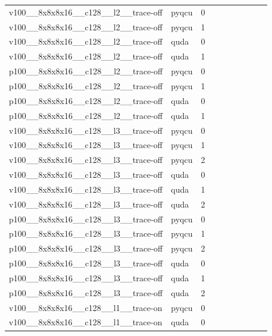 \begin{table}[htbp]
\begin{tabular}{@{}llrrrrrrrr@{}}
v100\_\_8x8x8x16\_\_c128\_\_l2\_\_trace-off & pyqcu & 0 &  &  &  &  &  &  &  \\
v100\_\_8x8x8x16\_\_c128\_\_l2\_\_trace-off & pyqcu & 1 &  &  &  &  &  &  &  \\
v100\_\_8x8x8x16\_\_c128\_\_l2\_\_trace-off & quda & 0 &  &  &  &  &  &  &  \\
v100\_\_8x8x8x16\_\_c128\_\_l2\_\_trace-off & quda & 1 &  &  &  &  &  &  &  \\
p100\_\_8x8x8x16\_\_c128\_\_l2\_\_trace-off & pyqcu & 0 &  &  &  &  &  &  &  \\
p100\_\_8x8x8x16\_\_c128\_\_l2\_\_trace-off & pyqcu & 1 &  &  &  &  &  &  &  \\
p100\_\_8x8x8x16\_\_c128\_\_l2\_\_trace-off & quda & 0 &  &  &  &  &  &  &  \\
p100\_\_8x8x8x16\_\_c128\_\_l2\_\_trace-off & quda & 1 &  &  &  &  &  &  &  \\
v100\_\_8x8x8x16\_\_c128\_\_l3\_\_trace-off & pyqcu & 0 &  &  &  &  &  &  &  \\
v100\_\_8x8x8x16\_\_c128\_\_l3\_\_trace-off & pyqcu & 1 &  &  &  &  &  &  &  \\
v100\_\_8x8x8x16\_\_c128\_\_l3\_\_trace-off & pyqcu & 2 &  &  &  &  &  &  &  \\
v100\_\_8x8x8x16\_\_c128\_\_l3\_\_trace-off & quda & 0 &  &  &  &  &  &  &  \\
v100\_\_8x8x8x16\_\_c128\_\_l3\_\_trace-off & quda & 1 &  &  &  &  &  &  &  \\
v100\_\_8x8x8x16\_\_c128\_\_l3\_\_trace-off & quda & 2 &  &  &  &  &  &  &  \\
p100\_\_8x8x8x16\_\_c128\_\_l3\_\_trace-off & pyqcu & 0 &  &  &  &  &  &  &  \\
p100\_\_8x8x8x16\_\_c128\_\_l3\_\_trace-off & pyqcu & 1 &  &  &  &  &  &  &  \\
p100\_\_8x8x8x16\_\_c128\_\_l3\_\_trace-off & pyqcu & 2 &  &  &  &  &  &  &  \\
p100\_\_8x8x8x16\_\_c128\_\_l3\_\_trace-off & quda & 0 &  &  &  &  &  &  &  \\
p100\_\_8x8x8x16\_\_c128\_\_l3\_\_trace-off & quda & 1 &  &  &  &  &  &  &  \\
p100\_\_8x8x8x16\_\_c128\_\_l3\_\_trace-off & quda & 2 &  &  &  &  &  &  &  \\
v100\_\_8x8x8x16\_\_c128\_\_l1\_\_trace-on & pyqcu & 0 &  &  &  &  &  &  &  \\
v100\_\_8x8x8x16\_\_c128\_\_l1\_\_trace-on & quda & 0 &  &  &  &  &  &  &  \\

\end{tabular}
\end{table}
